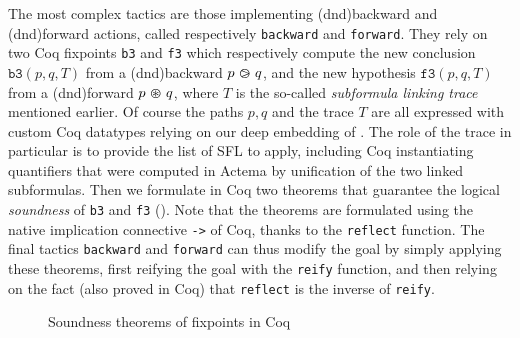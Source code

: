 The most complex tactics are those implementing \kl(dnd){backward} and \kl(dnd){forward} 
actions, called respectively \texttt{backward} and \texttt{forward}. They rely
on two Coq fixpoints \texttt{b3} and \texttt{f3} which respectively compute the
new conclusion $\mathtt{b3}(p, q, T)$ from a \kl(dnd){backward}  $p \operatorname{\,\varogreaterthan\,} q$, and
the new hypothesis $\mathtt{f3}(p, q, T)$ from a \kl(dnd){forward}  $p \operatorname{\,\varoast\,} q$,
where $T$ is the so-called \emph{subformula linking trace} mentioned earlier. Of
course the paths $p, q$ and the trace $T$ are all expressed with custom Coq
datatypes relying on our deep embedding of . The role of the
trace in particular is to provide the list of SFL  to apply,
including Coq  instantiating quantifiers that were computed in Actema by
unification of the two linked subformulas. Then we formulate in Coq two theorems
that guarantee the logical \emph{soundness} of \texttt{b3} and \texttt{f3}
(). Note that the theorems are formulated using the native
implication connective \texttt{->} of Coq, thanks to the \texttt{reflect}
function. The final tactics \texttt{backward} and \texttt{forward} can thus
modify the goal by simply applying these theorems, first reifying the goal with
the \texttt{reify} function, and then relying on the fact (also proved in Coq)
that \texttt{reflect} is the inverse of \texttt{reify}.

\begin{figure}
  
  \caption{Soundness theorems of  fixpoints in Coq}
\end{figure}


